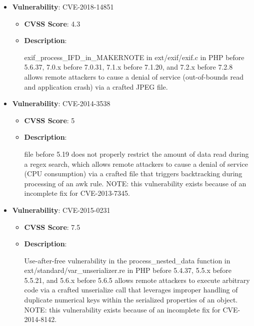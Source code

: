 \documentclass{article}
\begin{document}
\begin{itemize}
        \item \textbf{Vulnerability}: CVE-2018-14851
        \begin{itemize}
            \item \textbf{CVSS Score}:  4.3 
            \item \textbf{Description}:
            \parbox[t]{0.9\linewidth}{
                \ttfamily exif\_process\_IFD\_in\_MAKERNOTE in ext/exif/exif.c in PHP before 5.6.37, 7.0.x before 7.0.31, 7.1.x before 7.1.20, and 7.2.x before 7.2.8 allows remote attackers to cause a denial of service (out-of-bounds read and application crash) via a crafted JPEG file.
            }
        \end{itemize}
    
        \item \textbf{Vulnerability}: CVE-2014-3538
        \begin{itemize}
            \item \textbf{CVSS Score}:  5 
            \item \textbf{Description}:
            \parbox[t]{0.9\linewidth}{
                \ttfamily file before 5.19 does not properly restrict the amount of data read during a regex search, which allows remote attackers to cause a denial of service (CPU consumption) via a crafted file that triggers backtracking during processing of an awk rule.  NOTE: this vulnerability exists because of an incomplete fix for CVE-2013-7345.
            }
        \end{itemize}
    
        \item \textbf{Vulnerability}: CVE-2015-0231
        \begin{itemize}
            \item \textbf{CVSS Score}:  7.5 
            \item \textbf{Description}:
            \parbox[t]{0.9\linewidth}{
                \ttfamily Use-after-free vulnerability in the process\_nested\_data function in ext/standard/var\_unserializer.re in PHP before 5.4.37, 5.5.x before 5.5.21, and 5.6.x before 5.6.5 allows remote attackers to execute arbitrary code via a crafted unserialize call that leverages improper handling of duplicate numerical keys within the serialized properties of an object.  NOTE: this vulnerability exists because of an incomplete fix for CVE-2014-8142.
            }
        \end{itemize}
    

\end{itemize}
\end{document}
